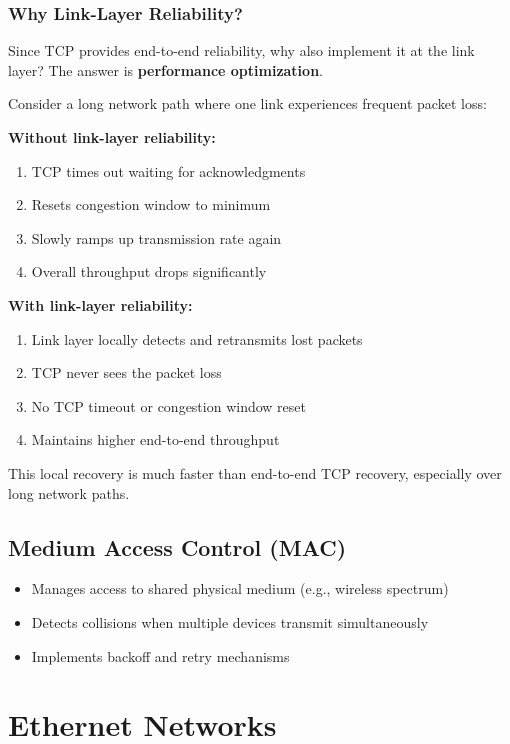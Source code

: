 \documentclass[../../compsys.tex]{subfiles}
\begin{document}
\subsubsection{Why Link-Layer Reliability?}

Since TCP provides end-to-end reliability, why also implement it at the link layer? The answer is \textbf{performance optimization}.

Consider a long network path where one link experiences frequent packet loss:

\textbf{Without link-layer reliability:}
\begin{enumerate}
    \item TCP times out waiting for acknowledgments
    \item Resets congestion window to minimum
    \item Slowly ramps up transmission rate again
    \item Overall throughput drops significantly
\end{enumerate}

\textbf{With link-layer reliability:}
\begin{enumerate}
    \item Link layer locally detects and retransmits lost packets
    \item TCP never sees the packet loss
    \item No TCP timeout or congestion window reset
    \item Maintains higher end-to-end throughput
\end{enumerate}

This local recovery is much faster than end-to-end TCP recovery, especially over long network paths.

\subsection{Medium Access Control (MAC)}
\begin{itemize}
    \item Manages access to shared physical medium (e.g., wireless spectrum)
    \item Detects collisions when multiple devices transmit simultaneously
    \item Implements backoff and retry mechanisms
\end{itemize}

\newpage
\section{Ethernet Networks}
\end{document}
